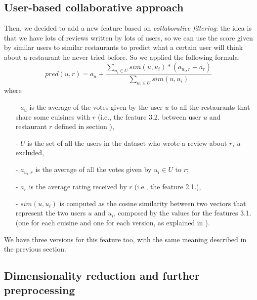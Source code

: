 \subsection{User-based collaborative approach}\label{sec:coll-appr}

Then, we decided to add a new feature based on \textit{collaborative filtering}: the idea is that we have lots of reviews written by lots of users, so we can use the score given by similar users to similar restaurants to predict what a certain user will think about a restaurant he never tried before.
So we applied the following formula:
\begin{equation}
    pred(u, r) = a_u + \frac{\sum_{u_i \in U} sim(u, u_i) * \left( a_{u_i, r} - a_r \right)} {\sum_{u_i \in U} sim(u, u_i)}
\end{equation}
where
\begin{itemize}
	\item[-] $a_u$ is the average of the votes given by the user $u$ to all the restaurants that share some cuisines with $r$ (i.e., the feature 3.2. between user $u$ and restaurant $r$ defined in section ),
	\item[-] $U$ is the set of all the users in the dataset who wrote a review about $r$, $u$ excluded,
	\item[-] $a_{u_i, r}$ is the average of all the votes given by $u_i \in U$ to $r$;
	\item[-] $a_r$ is the average rating received by $r$ (i.e., the feature 2.1.),
	\item[-] $sim(u, u_i)$ is computed as the cosine similarity between two vectors that represent the two users $u$ and $u_i$, composed by the values for the features 3.1. (one for each cuisine and one for each version, as explained in ).
\end{itemize}

We have three versions for this feature too, with the same meaning described in the previous section.

\subsection{Dimensionality reduction and further preprocessing}\label{sec:dim-red}

